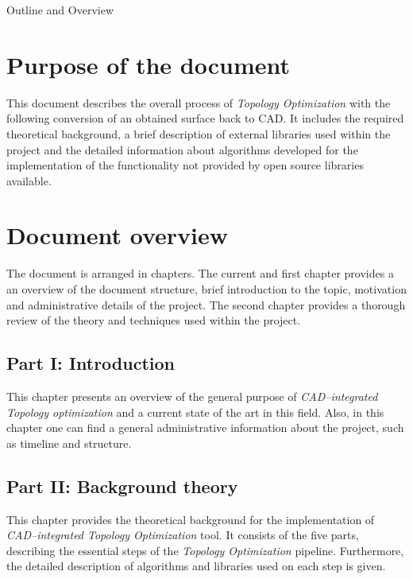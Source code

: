 \clearemptydoublepage

{}

\begin{center}
	\huge{Outline and Overview}
\end{center}




\section*{Purpose of the document}
This document describes the overall process of \textit{Topology Optimization} with the following conversion of an obtained surface back to CAD. It includes the required theoretical background, a brief description of external libraries used within the project and the detailed information about algorithms developed for the implementation of the functionality not provided by open source libraries available.

\section*{Document overview}
The document is arranged in chapters. The current and first chapter provides a an overview of the document structure, brief introduction to the topic, motivation and administrative details of the project. The second chapter provides a thorough review of the theory and techniques used within the project.
\subsection*{Part I: Introduction}

  \vspace{1mm}

\noindent  This chapter presents an overview of the general purpose of \textit{CAD--integrated Topology optimization} and a current state of the art in this field. Also, in this chapter one can find a general administrative information about the project, such as timeline and structure.
 \\


\subsection*{Part II: Background theory}

  \vspace{1mm}

\noindent This chapter provides the theoretical background for the implementation of \textit{CAD--integrated Topology Optimization} tool. It consists of the five parts, describing the essential steps of the \textit{Topology Optimization} pipeline. Furthermore, the detailed description of algorithms and libraries used on each step is given.
\\